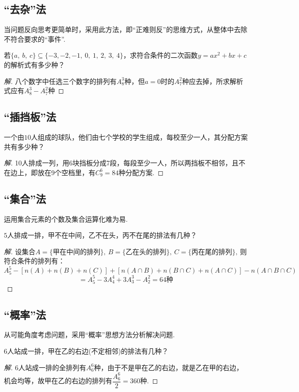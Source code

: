 \documentclass{BHCexam}
\begin{document}
\subsection{“去杂”法}
当问题反向思考更简单时，采用此方法，即“正难则反”的思维方式，从整体中去除不符合要求的“事件”.\par
\begin{example}
若$\{a,~b,~c\}\subseteq \{-3,-2,-1,~0,~1,~2,~3,~4\}$，求符合条件的二次函数$ y=ax^2+bx+c $的解析式有多少种？
\end{example}
\begin{proof}[解]
八个数字中任选三个数字的排列有$ A_8^3 $种，但$ a=0 $时的$ A_7^2 $种应去掉，所求解析式应有$ A_8^3-A_7^2 $种
\end{proof}
\subsection{“插挡板”法}                                                     
\begin{example}
一个由$ 10 $人组成的球队，他们由七个学校的学生组成，每校至少一人，其分配方案共有多少种？
\end{example}
\begin{proof}[解]
10人排成一列，用6块挡板分成7段，每段至少一人，所以两挡板不相邻，且不在边上，即放在9个空档里，有$ C_9^6 =84$种分配方案.
\end{proof}
\subsection{“集合”法}
运用集合元素的个数及集合运算化难为易.\par
\begin{example}
$5$人排成一排，甲不在中间，乙不在头，丙不在尾的排法有几种？
\end{example}
\begin{proof}[解]
设集合$ A=\{\text{甲在中间的排列}\} ,~B=\{\text{乙在头的排列}\},~C=\{\text{丙在尾的排列}\},~$则符合条件的排列有：\[A_5^5-\left[n(A)+n(B)+n(C)\right]+\left[n(A\cap B)+n(B\cap C)+n(A\cap C)\right]-n(A\cap B\cap C)\]\[=A_5^5-3A_4^4+3A_3^3-A_2^2=64\text{种}\]
\end{proof}
 \subsection{   “概率”法   }
 从可能角度考虑问题，采用“概率”思想方法分析解决问题.\par
\begin{example}
$6$人站成一排，甲在乙的右边(不定相邻)的排法有几种？
\end{example}
\begin{proof}[解]
$6$人站成一排的全排列有$ A_6^6 $种，由于不是甲在乙的右边，就是乙在甲的右边，机会均等，故甲在乙的右边的排列有$ \dfrac{A_6^6}{2}=360 $种.
\end{proof}
\end{document}
